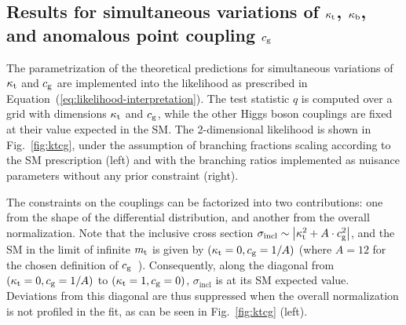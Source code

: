 \subsection{Results for simultaneous variations of \texorpdfstring{$\kappa_{\mathrm{t}}$}{kt}, \texorpdfstring{$\kappa_{\mathrm{b}}$}{kb}, and anomalous point coupling \texorpdfstring{$c_\mathrm{g}$}{cg}}
\label{sec:interpretation-results-ktcgkb}


The parametrization of the theoretical predictions for simultaneous variations of $\kappa_{\mathrm{t}}$ and $c_\mathrm{g}$ are implemented into the likelihood as prescribed in Equation~(\ref{eq:likelihood-interpretation}).
% 
The test statistic $q$ is computed over a grid with dimensions $\kappa_{\mathrm{t}}$ and $c_\mathrm{g}$, while the other Higgs boson couplings are fixed at their value expected in the SM.
% 
The 2-dimensional likelihood is shown in Fig.~\ref{fig:ktcg}, under the assumption of branching fractions scaling according to the SM prescription (left) and with the branching ratios implemented as nuisance parameters without any prior constraint (right).


The constraints on the couplings can be factorized into two contributions: one from the shape of the differential distribution, and another from the overall normalization.
% 
Note that the inclusive cross section $\sigma_\text{incl} \sim \left| \kappa_{\mathrm{t}}^2 + A \cdot c_\mathrm{g}^2 \right|$, and the SM in the limit of infinite $m_{\mathrm{t}}$ is given by $(\kappa_{\mathrm{t}}=0, c_\mathrm{g}=1/A)$ (where $A=12$ for the chosen definition of $c_\mathrm{g}$~\cite{Grazzini:2016paz}).
% 
Consequently, along the diagonal from $(\kappa_{\mathrm{t}}=0, c_\mathrm{g}=1/A)$ to $(\kappa_{\mathrm{t}}=1, c_\mathrm{g}=0)$, $\sigma_\text{incl}$ is at its SM expected value.
% 
Deviations from this diagonal are thus suppressed when the overall normalization is not profiled in the fit, as can be seen in Fig.~\ref{fig:ktcg} (left).


